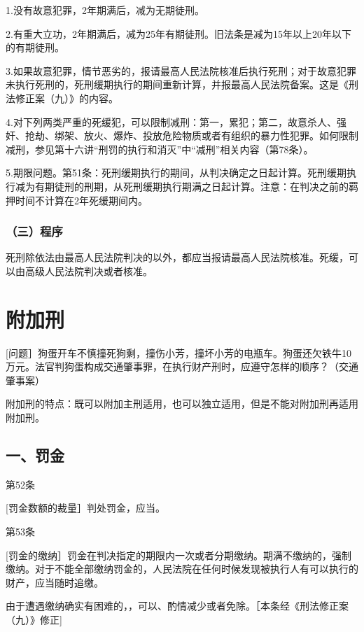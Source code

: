 1.没有故意犯罪，2年期满后，减为无期徒刑。

2.有重大立功，2年期满后，减为25年有期徒刑。旧法条是减为15年以上20年以下的有期徒刑。

3.如果故意犯罪，情节恶劣的，报请最高人民法院核准后执行死刑；对于故意犯罪未执行死刑的，死刑缓期执行的期间重新计算，并报最高人民法院备案。这是《刑法修正案（九）》的内容。

4.对下列两类严重的死缓犯，可以限制减刑：第一，累犯；第二，故意杀人、强奸、抢劫、绑架、放火、爆炸、投放危险物质或者有组织的暴力性犯罪。如何限制减刑，参见第十六讲“刑罚的执行和消灭”中“减刑”相关内容（第78条）。

5.期限问题。第51条：死刑缓期执行的期间，从判决确定之日起计算。死刑缓期执行减为有期徒刑的刑期，从死刑缓期执行期满之日起计算。注意：在判决之前的羁押时间不计算在2年死缓期间内。

\subsubsection*{（三）程序}

死刑除依法由最高人民法院判决的以外，都应当报请最高人民法院核准。死缓，可以由高级人民法院判决或者核准。

\section{附加刑}

[问题］狗蛋开车不慎撞死狗剩，撞伤小芳，撞坏小芳的电瓶车。狗蛋还欠铁牛10万元。法官判狗蛋构成交通肇事罪，在执行财产刑时，应遵守怎样的顺序？（交通肇事案）

附加刑的特点：既可以附加主刑适用，也可以独立适用，但是不能对附加刑再适用附加刑。


\subsection*{一、罚金}

第52条

[罚金数额的裁量］判处罚金，应当。

第53条

[罚金的缴纳］罚金在判决指定的期限内一次或者分期缴纳。期满不缴纳的，强制缴纳。对于不能全部缴纳罚金的，人民法院在任何时候发现被执行人有可以执行的财产，应当随时追缴。

由于遭遇缴纳确实有困难的，，可以、酌情减少或者免除。［本条经《刑法修正案（九）》修正]

